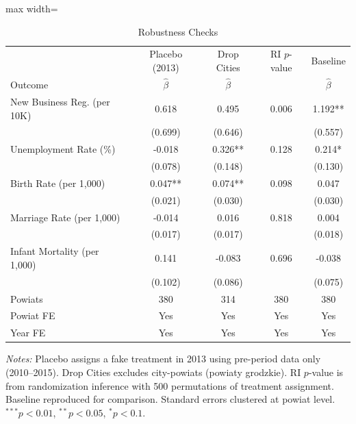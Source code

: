 \begin{table}[htbp]
\centering
\caption{Robustness Checks}
\label{tab:robustness}
\begin{threeparttable}
\begin{adjustbox}{max width=\textwidth}
\begin{tabular}{lcccc}
\toprule
 & Placebo (2013) & Drop Cities & RI $p$-value & Baseline \\
Outcome & $\hat{\beta}$ & $\hat{\beta}$ & & $\hat{\beta}$ \\
\midrule
New Business Reg. (per 10K) & 0.618 & 0.495 & 0.006 & 1.192** \\
 & (0.699) & (0.646) & & (0.557) \\
Unemployment Rate (\%) & -0.018 & 0.326** & 0.128 & 0.214* \\
 & (0.078) & (0.148) & & (0.130) \\
Birth Rate (per 1,000) & 0.047** & 0.074** & 0.098 & 0.047 \\
 & (0.021) & (0.030) & & (0.030) \\
Marriage Rate (per 1,000) & -0.014 & 0.016 & 0.818 & 0.004 \\
 & (0.017) & (0.017) & & (0.018) \\
Infant Mortality (per 1,000) & 0.141 & -0.083 & 0.696 & -0.038 \\
 & (0.102) & (0.086) & & (0.075) \\
\midrule
Powiats & 380 & 314 & 380 & 380 \\
Powiat FE & Yes & Yes & Yes & Yes \\
Year FE & Yes & Yes & Yes & Yes \\
\bottomrule
\end{tabular}
\end{adjustbox}
\begin{tablenotes}[flushleft]\small
\item \textit{Notes:} Placebo assigns a fake treatment in 2013 using pre-period data only (2010--2015). Drop Cities excludes city-powiats (powiaty grodzkie). RI $p$-value is from randomization inference with 500 permutations of treatment assignment. Baseline reproduced for comparison. Standard errors clustered at powiat level. $^{***}p<0.01$, $^{**}p<0.05$, $^{*}p<0.1$.
\end{tablenotes}
\end{threeparttable}
\end{table}
